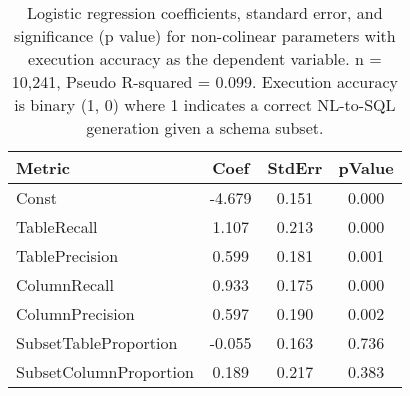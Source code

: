\begin{table}
\caption{Logistic regression coefficients, standard error, and significance (p value) for non-colinear parameters with execution accuracy as the dependent variable. n = 10,241, Pseudo R-squared = 0.099. Execution accuracy is binary (1, 0) where 1 indicates a correct NL-to-SQL generation given a schema subset.}
\label{tab:executionaccuracycorrelations}
\begin{tabular}{lccc}
\toprule
Metric & Coef & StdErr & pValue \\
\midrule
Const & -4.679 & 0.151 & 0.000 \\
TableRecall & 1.107 & 0.213 & 0.000 \\
TablePrecision & 0.599 & 0.181 & 0.001 \\
ColumnRecall & 0.933 & 0.175 & 0.000 \\
ColumnPrecision & 0.597 & 0.190 & 0.002 \\
SubsetTableProportion & -0.055 & 0.163 & 0.736 \\
SubsetColumnProportion & 0.189 & 0.217 & 0.383 \\
\bottomrule
\end{tabular}
\end{table}
